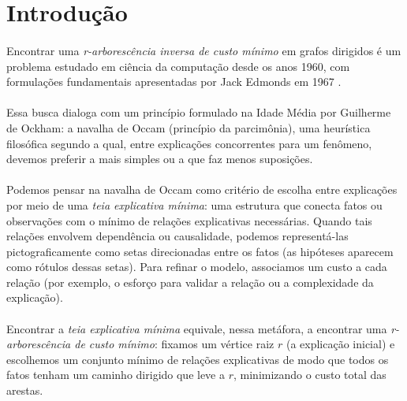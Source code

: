 \documentclass[12pt,a4paper]{article}
\begin{document}
\setcounter{tocdepth}{3}
\setcounter{secnumdepth}{3}
	\tableofcontents
\clearpage
\listoffigures
\clearpage

\section{Introdução}

\paragraph{}
Encontrar uma \textit{r-arborescência inversa de custo mínimo} em grafos dirigidos é um problema estudado em ciência da computação desde os anos 1960, com formulações fundamentais apresentadas por Jack Edmonds em 1967 \cite{edmonds1967optimum}.

\paragraph{}
Essa busca dialoga com um princípio formulado na Idade Média por Guilherme de Ockham: a navalha de Occam (princípio da parcimônia), uma heurística filosófica segundo a qual, entre explicações concorrentes para um fenômeno, devemos preferir a mais simples ou a que faz menos suposições.

\paragraph{}
Podemos pensar na navalha de Occam como critério de escolha entre explicações por meio de uma \textit{teia explicativa mínima}: uma estrutura que conecta fatos ou observações com o mínimo de relações explicativas necessárias.
Quando tais relações envolvem dependência ou causalidade, podemos representá-las pictograficamente como setas direcionadas entre os fatos (as hipóteses aparecem como rótulos dessas setas).
Para refinar o modelo, associamos um custo a cada relação (por exemplo, o esforço para validar a relação ou a complexidade da explicação).

\paragraph{}
Encontrar a \textit{teia explicativa mínima} equivale, nessa metáfora, a encontrar uma \textit{r-arborescência de custo mínimo}: fixamos um vértice raiz \(r\) (a explicação inicial) e escolhemos um conjunto mínimo de relações explicativas de modo que todos os fatos tenham um caminho dirigido que leve a \(r\), minimizando o custo total das arestas.
\end{document}
